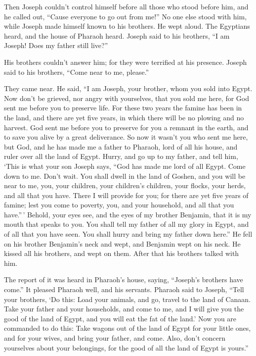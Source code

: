  Then Joseph couldn't control himself before all those who
stood before him, and he called out, ``Cause everyone to go out from
me!'' No one else stood with him, while Joseph made himself known to his
brothers.  He wept aloud. The Egyptians heard, and the
house of Pharaoh heard.  Joseph said to his brothers, ``I
am Joseph! Does my father still live?''

His brothers couldn't answer him; for they were terrified at his
presence.  Joseph said to his brothers, ``Come near to me,
please.''

They came near. He said, ``I am Joseph, your brother, whom you sold into
Egypt.  Now don't be grieved, nor angry with yourselves,
that you sold me here, for God sent me before you to preserve life.
 For these two years the famine has been in the land, and
there are yet five years, in which there will be no plowing and no
harvest.  God sent me before you to preserve for you a
remnant in the earth, and to save you alive by a great deliverance.
 So now it wasn't you who sent me here, but God, and he
has made me a father to Pharaoh, lord of all his house, and ruler over
all the land of Egypt.  Hurry, and go up to my father, and
tell him, `This is what your son Joseph says, ``God has made me lord of
all Egypt. Come down to me. Don't wait.  You shall dwell
in the land of Goshen, and you will be near to me, you, your children,
your children's children, your flocks, your herds, and all that you
have.  There I will provide for you; for there are yet
five years of famine; lest you come to poverty, you, and your household,
and all that you have.''\,'  Behold, your eyes see, and
the eyes of my brother Benjamin, that it is my mouth that speaks to you.
 You shall tell my father of all my glory in Egypt, and
of all that you have seen. You shall hurry and bring my father down
here.''  He fell on his brother Benjamin's neck and wept,
and Benjamin wept on his neck.  He kissed all his
brothers, and wept on them. After that his brothers talked with him.

 The report of it was heard in Pharaoh's house, saying,
``Joseph's brothers have come.'' It pleased Pharaoh well, and his
servants.  Pharaoh said to Joseph, ``Tell your brothers,
`Do this: Load your animals, and go, travel to the land of Canaan.
 Take your father and your households, and come to me,
and I will give you the good of the land of Egypt, and you will eat the
fat of the land.'  Now you are commanded to do this: Take
wagons out of the land of Egypt for your little ones, and for your
wives, and bring your father, and come.  Also, don't
concern yourselves about your belongings, for the good of all the land
of Egypt is yours.''

